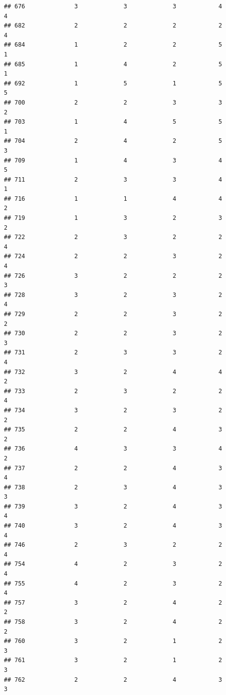 \documentclass[
]{article}
\begin{document}
\begin{verbatim}
## 676              3             3             3            4          4
## 682              2             2             2            2          4
## 684              1             2             2            5          1
## 685              1             4             2            5          1
## 692              1             5             1            5          5
## 700              2             2             3            3          2
## 703              1             4             5            5          1
## 704              2             4             2            5          3
## 709              1             4             3            4          5
## 711              2             3             3            4          1
## 716              1             1             4            4          2
## 719              1             3             2            3          2
## 722              2             3             2            2          4
## 724              2             2             3            2          4
## 726              3             2             2            2          3
## 728              3             2             3            2          4
## 729              2             2             3            2          2
## 730              2             2             3            2          3
## 731              2             3             3            2          4
## 732              3             2             4            4          2
## 733              2             3             2            2          4
## 734              3             2             3            2          2
## 735              2             2             4            3          2
## 736              4             3             3            4          2
## 737              2             2             4            3          4
## 738              2             3             4            3          3
## 739              3             2             4            3          4
## 740              3             2             4            3          4
## 746              2             3             2            2          4
## 754              4             2             3            2          4
## 755              4             2             3            2          4
## 757              3             2             4            2          2
## 758              3             2             4            2          2
## 760              3             2             1            2          3
## 761              3             2             1            2          3
## 762              2             2             4            3          3

\end{verbatim}
\end{document}
